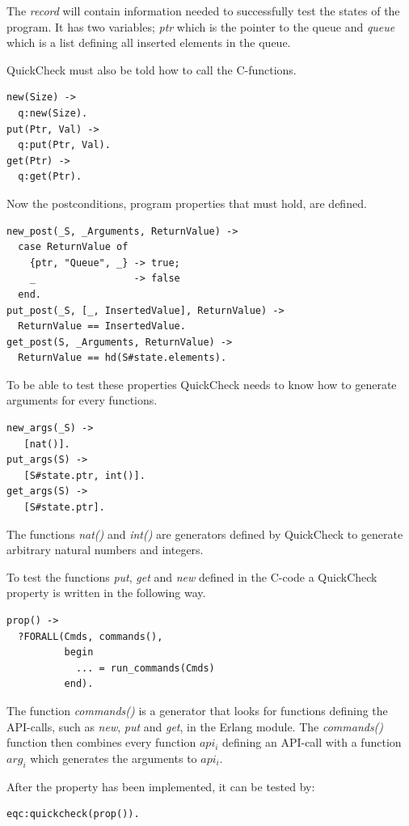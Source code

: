 The \emph{record} will contain information needed to successfully
test the states of the program. It has two variables;
\emph{ptr} which is the pointer to the queue and
\emph{queue} which is a list defining all inserted elements in the queue.

QuickCheck must also be told how to call the C-functions.
\begin{lstlisting}
new(Size) ->
  q:new(Size).
put(Ptr, Val) ->
  q:put(Ptr, Val).
get(Ptr) ->
  q:get(Ptr).
\end{lstlisting}

Now the postconditions, program properties that must hold, are defined.
\begin{lstlisting}
new_post(_S, _Arguments, ReturnValue) ->
  case ReturnValue of
    {ptr, "Queue", _} -> true;
    _                 -> false
  end.
put_post(_S, [_, InsertedValue], ReturnValue) ->
  ReturnValue == InsertedValue.
get_post(S, _Arguments, ReturnValue) ->
  ReturnValue == hd(S#state.elements).
\end{lstlisting}

To be able to test these properties QuickCheck needs to know how to generate
arguments for every functions.
\begin{lstlisting}
new_args(_S) ->
   [nat()].
put_args(S) ->
   [S#state.ptr, int()].
get_args(S) ->
   [S#state.ptr].
\end{lstlisting}
The functions \emph{nat()} and \emph{int()} are generators
defined by QuickCheck to generate arbitrary natural numbers and integers.

To test the functions \emph{put}, \emph{get} and \emph{new} defined in the C-code a QuickCheck
property is written in the following way.  \lstset{style=erlang}
\begin{lstlisting}
prop() ->
  ?FORALL(Cmds, commands(),
          begin
            ... = run_commands(Cmds)
          end).
\end{lstlisting}

The function \emph{commands()} is a generator that looks
for functions defining the API-calls, such as \emph{new}, \emph{put} and
\emph{get}, in the Erlang module. The \emph{commands()} function then combines
every function $api_i$ defining an API-call with a function $arg_i$ which
generates the arguments to $api_i$.

After the property has been implemented, it can be tested by:

\begin{lstlisting}
eqc:quickcheck(prop()).
\end{lstlisting}


